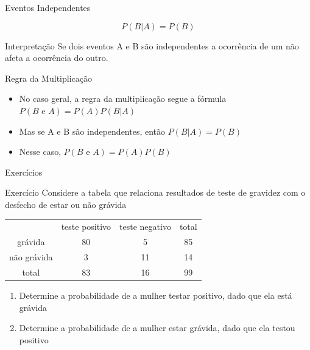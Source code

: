 \documentclass{beamer}
\begin{document}
\begin{frame}{Eventos Independentes}
  \begin{definition}
    \begin{displaymath}
      P(B|A) = P(B)
    \end{displaymath}
  \end{definition}
  \begin{block}{Interpretação}
    Se dois eventos A e B são independentes a ocorrência de um não
    afeta a ocorrência do outro.
  \end{block}
\end{frame}


\begin{frame}{Regra da Multiplicação}
  \begin{itemize}
  \item No caso geral, a regra da multiplicação segue a fórmula $P(B \text{ e } A) = P(A)P(B|A)$
  \item Mas se A e B são independentes, então $P(B|A) = P(B)$
  \item Nesse caso, $P(B \text{ e } A) = P(A)P(B)$
  \end{itemize}
\end{frame}

\begin{frame}{Exercícios}
  \begin{block}{Exercício}
    Considere a tabela que relaciona resultados de teste de gravidez
    com o desfecho de estar ou não grávida
    \begin{tabular}{ccc|c}
      & teste positivo & teste negativo & total\\
      grávida & 80 & 5 & 85\\
      não grávida & 3 & 11 & 14\\
      \hline
      total & 83 & 16 & 99\\
    \end{tabular}
    \begin{enumerate}
    \item Determine a probabilidade de a mulher testar positivo, dado
      que ela está grávida
    \item Determine a probabilidade de a mulher estar grávida, dado
      que ela testou positivo
    \end{enumerate}
  \end{block}
\end{frame}
\end{document}
